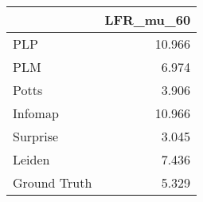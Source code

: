 \begin{tabular}{lr}
\toprule
{} & LFR_mu_60 \\
\midrule
PLP          &    10.966 \\
PLM          &     6.974 \\
Potts        &     3.906 \\
Infomap      &    10.966 \\
Surprise     &     3.045 \\
Leiden       &     7.436 \\
Ground Truth &     5.329 \\
\bottomrule
\end{tabular}
